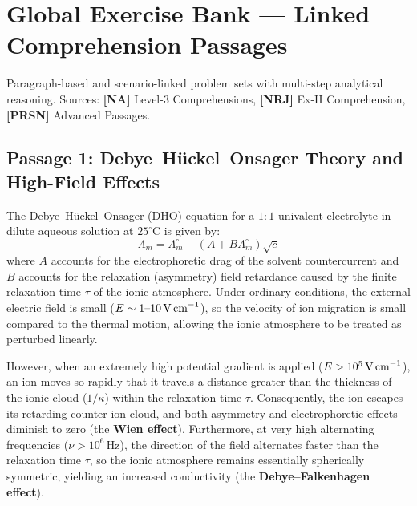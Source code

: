 \chapter*{Global Exercise Bank --- Linked Comprehension Passages}
\label{chap:comprehension}

\begin{tcolorbox}[enhanced,colback=subtleblue,colframe=primarynavy,arc=2mm,boxrule=1pt,
    title=\textbf{\large Linked Comprehension / Case-Study Questions (All Chapters)}]
Paragraph-based and scenario-linked problem sets with multi-step analytical reasoning.
Sources: \textbf{[NA]} Level-3 Comprehensions, \textbf{[NRJ]} Ex-II Comprehension, \textbf{[PRSN]} Advanced Passages.
\end{tcolorbox}

\section*{Passage 1: Debye--H\"{u}ckel--Onsager Theory and High-Field Effects}

The Debye--H\"{u}ckel--Onsager (DHO) equation for a $1:1$ univalent electrolyte in dilute aqueous solution at $25^\circ\text{C}$ is given by:
\begin{equation*}
    \Lambda_m = \Lambda_m^\circ - (A + B\Lambda_m^\circ)\sqrt{c}
\end{equation*}
where $A$ accounts for the electrophoretic drag of the solvent countercurrent and $B$ accounts for the relaxation (asymmetry) field retardance caused by the finite relaxation time $\tau$ of the ionic atmosphere. Under ordinary conditions, the external electric field is small ($E \sim 1\text{--}10\,\text{V\,cm}^{-1}$), so the velocity of ion migration is small compared to the thermal motion, allowing the ionic atmosphere to be treated as perturbed linearly.

However, when an extremely high potential gradient is applied ($E > 10^5\,\text{V\,cm}^{-1}$), an ion moves so rapidly that it travels a distance greater than the thickness of the ionic cloud ($1/\kappa$) within the relaxation time $\tau$. Consequently, the ion escapes its retarding counter-ion cloud, and both asymmetry and electrophoretic effects diminish to zero (the \textbf{Wien effect}). Furthermore, at very high alternating frequencies ($\nu > 10^6\,\text{Hz}$), the direction of the field alternates faster than the relaxation time $\tau$, so the ionic atmosphere remains essentially spherically symmetric, yielding an increased conductivity (the \textbf{Debye--Falkenhagen effect}).

